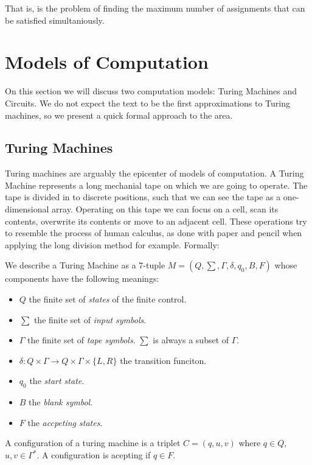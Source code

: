 \begin{definition}
That is, is the problem of finding the maximum number of assignments that can be satisfied simultaniously.

\section{Models of Computation}
On this section we will discuss two computation models: Turing Machines and Circuits. We do not expect the text to be the first approximations to Turing machines, so we present a quick formal approach to the area. 

\subsection{Turing Machines}
Turing machines are arguably the epicenter of  models of computation. A Turing Machine  represents a long mechanial tape on which we are going to operate. The tape is divided in to discrete positions, such that we can see the tape as a one-dimensional array. Operating on this tape we can focus on a cell, scan its contents, overwrite  its contents or move to an adjacent cell. These operations try to resemble the process of human calculus, as done with paper and pencil when applying the long division method  for example. Formally:

\begin{definition} We describe a Turing Machine as a 7-tuple $M=(Q, \sum, \Gamma, \delta, q_0, B, F)$ whose components have the following meanings:
  \begin{itemize}
  \item $Q$ the finite set of \emph{states} of the finite control.
  \item $\sum$ the finite set of \emph{input symbols}.
  \item $\Gamma$ the finite set of \emph{tape symbols}. $\sum$ is always a subset of $\Gamma$.
  \item  $\delta: Q\times \Gamma \to Q\times\Gamma\times\{L,R\}$ the transition funciton.
  \item $q_0$ the \emph{start state}.
  \item $B$ the \emph{blank symbol}.
  \item $F$ the \emph{accpeting states}.
  \end{itemize}

  A configuration of a turing machine is a triplet $C=(q,u,v)$ where $q\in Q$, $u,v\in \Gamma^*$. A configuration is acepting if $q\in F$.
\end{definition}


\end{definition}

